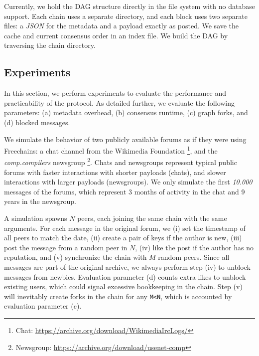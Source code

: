 \documentclass[10pt,journal,compsoc]{IEEEtran}
\newcommand{\FC}       {Freechains\xspace}
\begin{document}
Currently, we hold the DAG structure directly in the file system with no
database support.
Each chain uses a separate directory, and each block uses two separate files:
a \emph{JSON} for the metadata and a payload exactly as posted.
We save the cache and current consensus order in an index file.
We build the DAG by traversing the chain directory.

\subsection{Experiments}
\label{sec.consensus.eval}

In this section, we perform experiments to evaluate the performance and
practicability of the protocol.
%
As detailed further, we evaluate the following parameters:
    (a) metadata overhead,
    (b) consensus runtime,
    (c) graph forks, and
    (d) blocked messages.

We simulate the behavior of two publicly available forums as if they were using
\FC:
%
    a chat channel from the Wikimedia Foundation%
\footnote{ Chat: \url{https://archive.org/download/WikimediaIrcLogs/} }, and
    the \emph{comp.compilers} newsgroup%
\footnote{ Newsgroup: \url{https://archive.org/download/usenet-comp} }.
%
Chats and newsgroups represent typical public forums with
    faster interactions with shorter payloads (chats), and
    slower interactions with larger payloads (newsgroups).
%
We only simulate the first \emph{10.000} messages of the forums, which
represent 3 months of activity in the chat and 9 years in the newsgroup.

A simulation spawns $N$ peers, each joining the same chain with the same
arguments.
For each message in the original forum, we
    (i)   set the timestamp of all peers to match the date,
    (ii)  create a pair of keys if the author is new,
    (iii) post the message from a random peer in $N$,
    (iv)  like the post if the author has no reputation, and
    (v)   synchronize the chain with $M$ random peers.
%
Since all messages are part of the original archive, we always perform step
(iv) to unblock messages from newbies.
Evaluation parameter (d) counts extra likes to unblock existing users, which
could signal excessive bookkeeping in the chain.
Step (v) will inevitably create forks in the chain for any \texttt{M<N}, which
is accounted by evaluation parameter (c).
\end{document}
